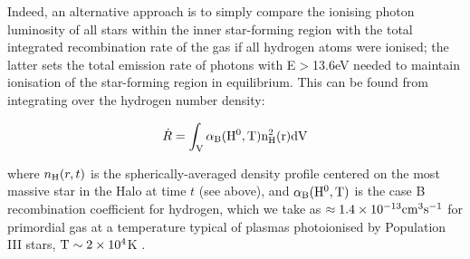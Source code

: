 \documentclass[graphics, twocolumn, usenatbib]{mn2e}
\begin{document}
Indeed, an alternative approach is to simply compare the ionising photon luminosity of all stars
within the inner star-forming region with the total integrated recombination rate of the gas if
all hydrogen atoms were ionised; the latter sets the total emission rate of photons with
E$>$13.6eV needed to maintain ionisation of the star-forming region in equilibrium. This can be
found from integrating over the hydrogen number density:

\begin{equation}
    \dot R = \int_{\rm{V}}\alpha_{\rm{B}}(\rm{H}^{0},T)n_{\rm{H}}^{2}(r)d\rm{V}
\end{equation}

\noindent where $n_{\rm{H}}(r, t)$ is the spherically-averaged density profile centered on the
most massive star in the Halo at time $t$ (see above), and $\alpha_{\rm{B}}(\rm{H}^{0},T)$ is the
case B recombination coefficient for hydrogen, which we take
as $\approx1.4\times 10^{-13}\rm{cm}^{3}\rm{s}^{-1}$ for primordial gas at a temperature typical of
plasmas photoionised by Population III stars, $\rm{T}\sim 2\times 10^{4}$K
\citep{Osterbrock2006, Johnson2012}. 
\end{document}

